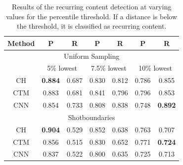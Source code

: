 \documentclass{report}
\begin{document}
\begin{table}[H]
	\begin{center}
		\begin{tabular}{ c c c c c c c} 
			\hline
			\textbf{Method} & \textbf{P} & \textbf{R} & \textbf{P} & \textbf{R} & \textbf{P} & \textbf{R} \\
			\hline
			\multicolumn{7}{c}{Uniform Sampling} \\
			 & \multicolumn{2}{c}{5\% lowest} & \multicolumn{2}{c}{7.5\% lowest} & \multicolumn{2}{c}{10\% lowest} \\
			\hline	
			CH 				& \textbf{0.884} 	& 0.687		& 0.830 	& 0.812 	& 0.786	 	& 0.855 \\
			CTM 			& 0.883 	& 0.681 		& 0.841 	& 0.796 & 0.796 	& 0.853 \\
			CNN 			& 0.854		& 0.733			& 0.808		& 0.838 & 0.748		& \textbf{0.892} \\
			\hline
			\multicolumn{7}{c}{Shotboundaries} \\
			\hline
			CH	 			& \textbf{0.904}		& 0.529 		& 0.852  	& 0.638 & 0.763	 	& 0.707 \\
			CTM 			& 0.856 	& 0.515 		& 0.830 	& 0.652 & 0.771		& \textbf{0.724} \\
			CNN 			& 0.837		& 0.522			& 0.800		& 0.635 & 0.725		& 0.713  \\
			\hline
		\end{tabular}
	\end{center}
	\caption{Results of the recurring content detection at varying values for the percentile threshold. If a distance is below the threshold, it is classified as recurring content.}
	\label{table:resultsrecurring}
\end{table}
\end{document}
